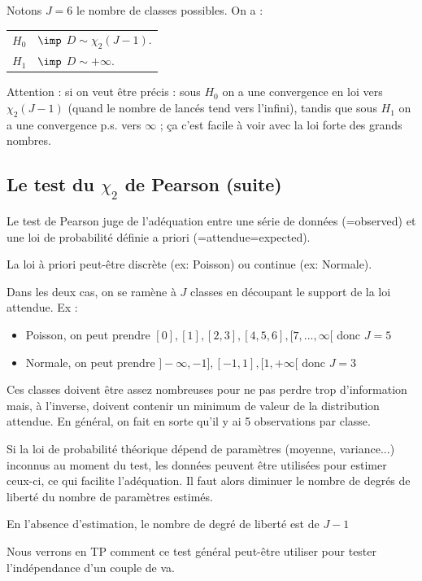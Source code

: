 \documentclass{article}
\begin{document}
Notons $J=6$ le nombre de classes possibles. On a :

\begin{tabular}{ll}
$H_0$  &$\imp$  $D\sim  \chi_2 (J-1)$.  \\
$H_1$  &$\imp$  $D \sim + \infty $. 
\end{tabular}

Attention : si on veut être précis : sous $H_0$ on a une convergence en loi vers $ \chi_2 (J-1)$ (quand le nombre de lancés tend vers l'infini), tandis que sous $H_1$ on a une convergence p.s. vers $\infty$ ; ça c'est facile à voir avec la loi forte des grands nombres.



\subsection{Le test du $\chi_2$ de Pearson (suite)}


Le test de Pearson juge de l'adéquation entre une série de données (=observed) et une loi de probabilité définie a priori (=attendue=expected).

La loi à priori peut-être discrète (ex: Poisson) ou continue (ex: Normale).

Dans les deux cas, on se ramène à $J$ classes  en découpant le support de la loi attendue. Ex :
\begin{itemize}
\item Poisson, on peut prendre $[0], [1], [2,3], [4,5,6], [7,..., \infty[ $  donc $J=5$
\item Normale, on peut prendre  $]-\infty,-1], [-1,1], [1,+\infty[$             donc $J=3$
\end{itemize}
Ces classes doivent être assez nombreuses pour ne pas perdre trop d'information mais, à l'inverse,
doivent contenir un minimum de valeur de la distribution attendue.
En général, on fait en sorte qu'il y ai 5 observations par classe.

Si la loi de probabilité théorique dépend de paramètres (moyenne, variance...) inconnus au moment du test,
les données peuvent être utilisées pour estimer ceux-ci, ce qui facilite l'adéquation.
Il faut alors diminuer le nombre de degrés de liberté du nombre de paramètres estimés. 

En l'absence d'estimation,  le nombre de degré de liberté est de $J-1$


Nous verrons en TP comment ce test général peut-être utiliser pour tester l'indépendance d'un couple de va. 
\end{document}
